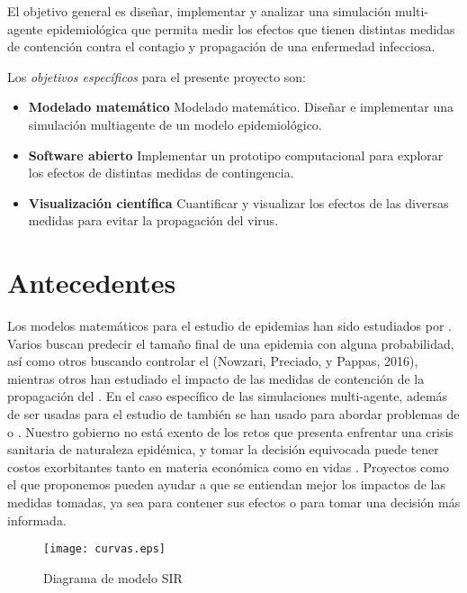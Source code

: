 \documentclass[a4]{sciposter}
\begin{document}
\begin{multicols}{2}
El objetivo general es diseñar, implementar y analizar una simulación multi-agente epidemiológica que permita medir los efectos que tienen distintas medidas de contención contra el contagio y propagación de una enfermedad infecciosa.\par
Los \emph{objetivos específicos} para el presente proyecto son:\par
\begin{itemize}
  \item \textbf{Modelado matemático} Modelado matemático. Diseñar e implementar una simulación multiagente de un modelo epidemiológico.
  \item \textbf{Software abierto} Implementar un prototipo computacional para explorar los efectos de distintas medidas de contingencia.
  \item \textbf{Visualización científica} Cuantificar y visualizar los efectos de las diversas medidas para evitar la propagación del virus.
\end{itemize}

\section{Antecedentes}
Los modelos matemáticos para el estudio de epidemias han sido estudiados por \citet{decadas}. Varios buscan predecir el tamaño final de una epidemia con alguna probabilidad, así como otros buscando controlar el \citet{contagio} (Nowzari, Preciado, y Pappas, 2016), mientras otros han estudiado el impacto de las medidas de contención de la propagación del \citet{virus}. En el caso específico de las simulaciones multi-agente, además de ser usadas para el estudio de \citet{epidemias} también se han usado para abordar problemas de \citet{transporte} o \citet{finanzas}. Nuestro gobierno no está exento de los retos que presenta enfrentar una crisis sanitaria de naturaleza epidémica, y tomar la decisión equivocada puede tener costos exorbitantes tanto en materia económica como en vidas \citet{humanas}. Proyectos como el que proponemos pueden ayudar a que se entiendan mejor los impactos de las medidas tomadas, ya sea para contener sus efectos o para tomar una decisión más informada.

\begin{figure}
\setcounter{figure}{1}
\captionsetup{type=figure}
\begin{center}
   \texttt{[image: curvas.eps]}
   \end{center}
    \caption{Diagrama de modelo SIR}
    \label{curvas}
\end{figure}


\end{multicols}
\end{document}
